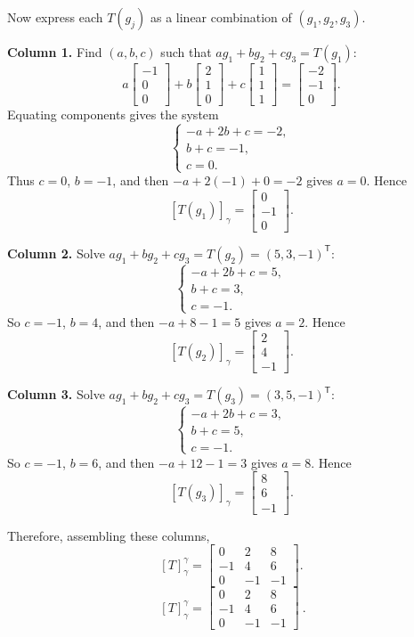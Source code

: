 \documentclass[12pt]{article}
\begin{document}
Now express each $T(g_j)$ as a linear combination of $(g_1,g_2,g_3)$.

\medskip
\noindent\textbf{Column 1.}
Find $(a,b,c)$ such that $a g_1+b g_2+c g_3=T(g_1)$:
\[
a\!\begin{bmatrix}-1\\0\\0\end{bmatrix}
+b\!\begin{bmatrix}2\\1\\0\end{bmatrix}
+c\!\begin{bmatrix}1\\1\\1\end{bmatrix}
=
\begin{bmatrix}-2\\-1\\0\end{bmatrix}.
\]
Equating components gives the system
\[
\begin{cases}
-a+2b+c=-2,\\
b+c=-1,\\
c=0.
\end{cases}
\]
Thus $c=0$, $b=-1$, and then $-a+2(-1)+0=-2$ gives $a=0$. Hence
\[
[T(g_1)]_\gamma=\begin{bmatrix}0\\-1\\0\end{bmatrix}.
\]

\medskip
\noindent\textbf{Column 2.}
Solve $a g_1+b g_2+c g_3=T(g_2)=(5,3,-1)^{\mathsf T}$:
\[
\begin{cases}
-a+2b+c=5,\\
b+c=3,\\
c=-1.
\end{cases}
\]
So $c=-1$, $b=4$, and then $-a+8-1=5$ gives $a=2$. Hence
\[
[T(g_2)]_\gamma=\begin{bmatrix}2\\4\\-1\end{bmatrix}.
\]

\medskip
\noindent\textbf{Column 3.}
Solve $a g_1+b g_2+c g_3=T(g_3)=(3,5,-1)^{\mathsf T}$:
\[
\begin{cases}
-a+2b+c=3,\\
b+c=5,\\
c=-1.
\end{cases}
\]
So $c=-1$, $b=6$, and then $-a+12-1=3$ gives $a=8$. Hence
\[
[T(g_3)]_\gamma=\begin{bmatrix}8\\6\\-1\end{bmatrix}.
\]

Therefore, assembling these columns,
\[
[T]_\gamma^\gamma=
\begin{bmatrix}
0&2&8\\
-1&4&6\\
0&-1&-1
\end{bmatrix}.
\]
\[
\boxed{\ [T]_{\gamma}^{\gamma}=
\begin{bmatrix}
0&2&8\\
-1&4&6\\
0&-1&-1
\end{bmatrix}\ }.
\]
\end{document}
